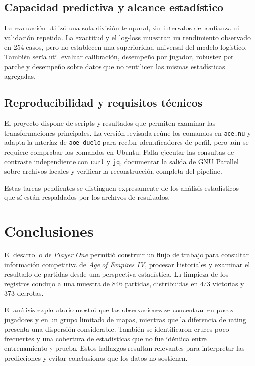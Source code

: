 \documentclass[12pt,a4paper]{article}
\begin{document}
\subsection{Capacidad predictiva y alcance estadístico}

La evaluación utilizó una sola división temporal, sin intervalos de confianza ni validación repetida. La exactitud y el log-loss muestran un rendimiento observado en 254 casos, pero no establecen una superioridad universal del modelo logístico. También sería útil evaluar calibración, desempeño por jugador, robustez por parche y desempeño sobre datos que no reutilicen las mismas estadísticas agregadas.

\subsection{Reproducibilidad y requisitos técnicos}

El proyecto dispone de scripts y resultados que permiten examinar las transformaciones principales. La versión revisada reúne los comandos en \texttt{aoe.nu} y adapta la interfaz de \texttt{aoe duelo} para recibir identificadores de perfil, pero aún se requiere comprobar los comandos en Ubuntu. Falta ejecutar las consultas de contraste independiente con \texttt{curl} y \texttt{jq}, documentar la salida de GNU Parallel sobre archivos locales y verificar la reconstrucción completa del pipeline.

Estas tareas pendientes se distinguen expresamente de los análisis estadísticos que sí están respaldados por los archivos de resultados.

\section{Conclusiones}

El desarrollo de \textit{Player One} permitió construir un flujo de trabajo para consultar información competitiva de \textit{Age of Empires IV}, procesar historiales y examinar el resultado de partidas desde una perspectiva estadística. La limpieza de los registros condujo a una muestra de 846 partidas, distribuidas en 473 victorias y 373 derrotas.

El análisis exploratorio mostró que las observaciones se concentran en pocos jugadores y en un grupo limitado de mapas, mientras que la diferencia de rating presenta una dispersión considerable. También se identificaron cruces poco frecuentes y una cobertura de estadísticas que no fue idéntica entre entrenamiento y prueba. Estos hallazgos resultan relevantes para interpretar las predicciones y evitar conclusiones que los datos no sostienen.
\end{document}

